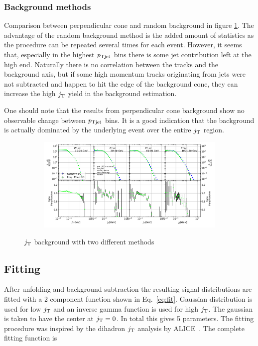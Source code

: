 \subsubsection{Background methods}
Comparison between perpendicular cone and random background in figure \ref{fig:bgcomparison}. The advantage of the random background method is the added amount of statistics as the procedure can be repeated several times for each event. However, it seems that, especially in the highest $p_{\rm Tjet}$ bins there is some jet contribution left at the high end. Naturally there is no correlation between the tracks and the background axis, but if some high momentum tracks originating from jets were not subtracted and happen to hit the edge of the background cone, they can increase the high $j_{\rm T}$ yield in the background estimation.

One should note that the results from perpendicular cone background show no observable change between $p_{\rm Tjet}$ bins. It is a good indication that the background is actually dominated by the underlying event over the entire $j_{\rm T}$ region. 
\begin{figure}
\centering
\begin{subfigure}{0.95\textwidth}
\includegraphics[width=\textwidth]{results/MixedFullJetsR04BackgroundComparison.pdf}
\end{subfigure}
\caption{$j_{\rm T}$ background with two different methods}
\label{fig:bgcomparison}
\end{figure}

 \subsection{Fitting}
After unfolding and background subtraction the resulting signal distributions are fitted with a 2 component function shown in Eq.~\ref{eq:fit}. Gaussian distribution is used for low $j_{\rm T}$ and an inverse gamma function is used for high $j_{\rm T}$. The gaussian is taken to have the center at $j_{\rm T} = 0$. In total this gives 5 parameters. The fitting procedure was inspired by the dihadron $j_{\rm T}$ analysis by ALICE~\cite{ALICEjt}. The complete fitting function is 

